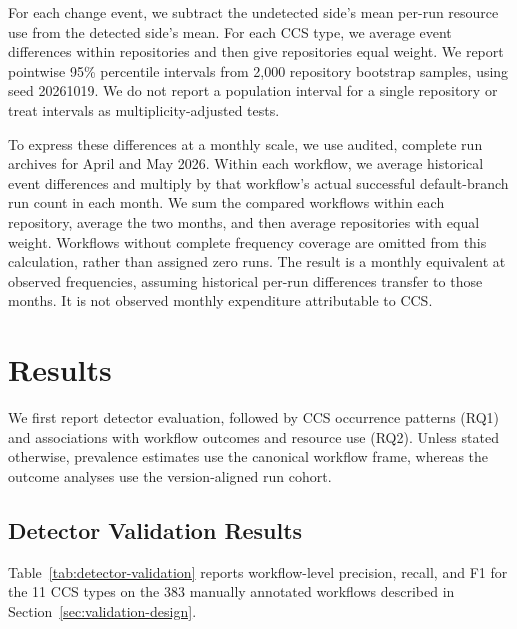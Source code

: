 \documentclass[smallextended]{svjour3}
\begin{document}
For each change event, we subtract the undetected side's mean per-run resource use from the detected side's mean. For each CCS type, we average event differences within repositories and then give repositories equal weight. We report pointwise 95\% percentile intervals from 2,000 repository bootstrap samples, using seed 20261019. We do not report a population interval for a single repository or treat intervals as multiplicity-adjusted tests.

To express these differences at a monthly scale, we use audited, complete run archives for April and May 2026. Within each workflow, we average historical event differences and multiply by that workflow's actual successful default-branch run count in each month. We sum the compared workflows within each repository, average the two months, and then average repositories with equal weight. Workflows without complete frequency coverage are omitted from this calculation, rather than assigned zero runs. The result is a monthly equivalent at observed frequencies, assuming historical per-run differences transfer to those months. It is not observed monthly expenditure attributable to CCS.

\section{Results}
\label{sec:results}

We first report detector evaluation, followed by CCS occurrence patterns (RQ1) and associations with workflow outcomes and resource use (RQ2). Unless stated otherwise, prevalence estimates use the canonical workflow frame, whereas the outcome analyses use the version-aligned run cohort.

\subsection{Detector Validation Results}
\label{subsec:detector-validation}

Table~\ref{tab:detector-validation} reports workflow-level precision, recall, and F1 for the 11 CCS types on the 383 manually annotated workflows described in Section~\ref{sec:validation-design}.
\end{document}

